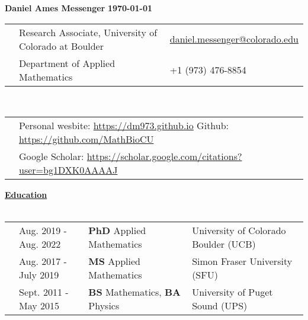 \documentclass[letterpaper,11pt,oneside]{article}
\newcommand{\headr}[1]{\vspace{10pt}\uline{\Large{\textbf{#1}} \hfill } \\ \vspace{-10pt}\\}
\begin{document}
%
\noindent 
\LARGE{\textbf{Daniel Ames Messenger} \hspace{2in} \textbf{\monthyeardate\today}} 
\normalsize
%
%
\begin{center}
\begin{tabular}{@{} p{0.01cm} @{} p{10cm} @{} p{6.5cm}@{} }
& Research Associate, University of Colorado at Boulder & \hspace{0.5in} \href{mailto:daniel.messenger@colorado.edu}{daniel.messenger@colorado.edu} \\
& Department of Applied Mathematics    & \hspace{3.2cm}  +1 (973) 476-8854 \\
\end{tabular}\\ \vspace{0.25cm}
\begin{tabular}{@{} p{0.01cm} @{} p{16.5cm}@{} }
& Personal wesbite: \url{https://dm973.github.io} \hspace{1.5cm} Github: \url{https://github.com/MathBioCU} \\
& Google Scholar: \url{https://scholar.google.com/citations?user=bg1DXK0AAAAJ}
\end{tabular}
\end{center}


\headr{Education}
 
\begin{tabular}{@{} p{0.01cm} @{} p{4.3cm} @{} p{5.7cm} @{} p{8cm}@{} }
& Aug. 2019 - Aug. 2022 & \textbf{PhD} Applied Mathematics & University of Colorado Boulder (UCB)\\ 
& Aug. 2017 - July 2019 & \textbf{MS} Applied Mathematics & Simon Fraser University (SFU)\\ 
& Sept. 2011 - May 2015  & \textbf{BS} Mathematics, \textbf{BA} Physics & University of Puget Sound (UPS)
\end{tabular}
\end{document}
